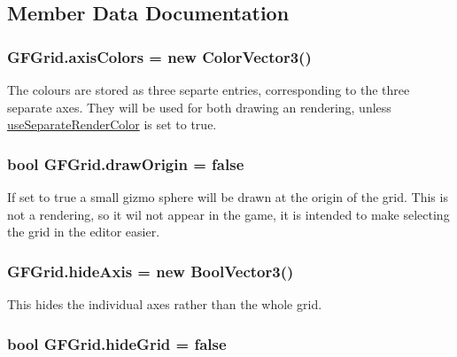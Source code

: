 \subsection{Member Data Documentation}
\hypertarget{class_g_f_grid_aa0dc7222dee5910e8df47e133f719309_aa0dc7222dee5910e8df47e133f719309}{
\subsubsection[{axis\+Colors}]{ G\+F\+Grid.\+axis\+Colors = new {\bf Color\+Vector3}()}}\label{class_g_f_grid_aa0dc7222dee5910e8df47e133f719309_aa0dc7222dee5910e8df47e133f719309}
The colours are stored as three separte entries, corresponding to the three separate axes. They will be used for both drawing an rendering, unless \hyperlink{class_g_f_grid_aeb78dcbc2890d20556958c994b95b000_aeb78dcbc2890d20556958c994b95b000}{use\+Separate\+Render\+Color} is set to {\ttfamily true}. \hypertarget{class_g_f_grid_a030e49e310751d9b1c7d08b57ca93358_a030e49e310751d9b1c7d08b57ca93358}{
\subsubsection[{draw\+Origin}]{\setlength{\rightskip}{0pt plus 5cm}bool G\+F\+Grid.\+draw\+Origin = false}}\label{class_g_f_grid_a030e49e310751d9b1c7d08b57ca93358_a030e49e310751d9b1c7d08b57ca93358}
If set to {\ttfamily true} a small gizmo sphere will be drawn at the origin of the grid. This is not a rendering, so it wil not appear in the game, it is intended to make selecting the grid in the editor easier. \hypertarget{class_g_f_grid_ac902d0ffe9b552908a929fda497a39b5_ac902d0ffe9b552908a929fda497a39b5}{
\subsubsection[{hide\+Axis}]{ G\+F\+Grid.\+hide\+Axis = new {\bf Bool\+Vector3}()}}\label{class_g_f_grid_ac902d0ffe9b552908a929fda497a39b5_ac902d0ffe9b552908a929fda497a39b5}
This hides the individual axes rather than the whole grid. \hypertarget{class_g_f_grid_afa8a9e01aac581a365606ac8c1b4af64_afa8a9e01aac581a365606ac8c1b4af64}{
\subsubsection[{hide\+Grid}]{\setlength{\rightskip}{0pt plus 5cm}bool G\+F\+Grid.\+hide\+Grid = false}}\label{class_g_f_grid_afa8a9e01aac581a365606ac8c1b4af64_afa8a9e01aac581a365606ac8c1b4af64}
